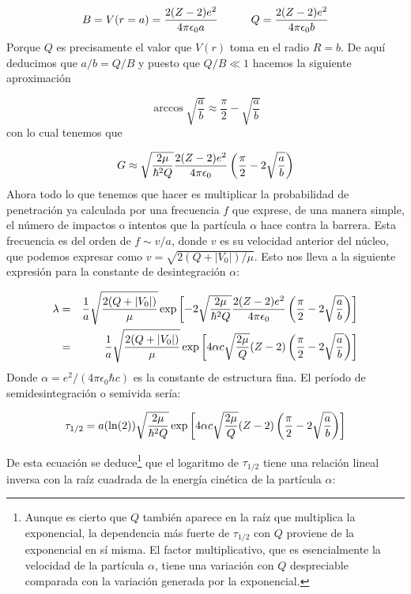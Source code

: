 \begin{equation}
    B= V(r=a) = \frac{2(Z-2)e^2}{4\pi \epsilon_0 a} \quad \quad \quad Q=\frac{2(Z-2)e^2}{4 \pi \epsilon_0 b}
\end{equation}
Porque $Q$ es precisamente el valor que $V(r)$ toma en el radio $R=b$. De aquí deducimos que $a/b=Q/B$ y puesto que $Q/B\ll 1$ hacemos la siguiente aproximación 

\begin{equation}
    \arccos \sqrt{\frac{a}{b}} \approx \frac{\pi}{2} - \sqrt{\frac{a}{b}}
\end{equation}
con lo cual tenemos que 

\begin{equation}
    G \approx  \sqrt{\frac{2\mu}{\hbar^2Q}} \frac{2(Z-2)e^2}{4 \pi \epsilon_0} \left( \frac{\pi}{2} -2 \sqrt{\frac{a}{b}} \right)
\end{equation}
Ahora todo lo que tenemos que hacer es multiplicar la probabilidad de penetración ya calculada por una frecuencia $f$ que exprese, de una manera simple, el número de impactos o intentos que la partícula $\alpha$ hace contra la barrera. Esta frecuencia es del orden de $f \sim v/a$, donde $v$ es su velocidad anterior del núcleo, que podemos expresar como $v=\sqrt{2(Q+|V_0|)/\mu}$. Esto nos lleva a la siguiente expresión para la constante de desintegración $\alpha$:

\begin{eqnarray}
    \lambda & = & \frac{1}{a} \sqrt{\frac{2(Q+|V_0|)}{\mu}} \exp \ccorchetes{-2  \sqrt{\frac{2 \mu}{\hbar^2 Q}} \frac{2(Z-2)e^2}{4 \pi \epsilon_0} \parentesis{\frac{\pi}{2}-2\sqrt{\frac{a}{b}}}} \\ \vspace{5.0mm}
            & = & \frac{1}{a} \sqrt{\frac{2(Q+|V_0|)}{\mu}}  \exp \ccorchetes{4 \alpha c \sqrt{\frac{2 \mu}{Q}} (Z-2) \parentesis{\frac{\pi}{2}-2\sqrt{\frac{a}{b}}}}
\end{eqnarray}
Donde $\alpha=e^2/(4 \pi \epsilon_0 \hbar c)$ es la constante de estructura fina. El período de semidesintegración o semivida sería:
\begin{mybox}
\begin{equation}
    \tau_{1/2} = a (\ln (2)) \sqrt{\frac{2\mu}{\hbar^2Q}} \exp \left[ 4 \alpha c \sqrt{\frac{2 \mu}{Q}} (Z-2) \left( \frac{\pi}{2}-2\sqrt{\frac{a}{b}} \right) \right]
    \label{Ec:02-01-22}
\end{equation}
\end{mybox}
De esta ecuación se deduce\footnote{Aunque es cierto que $Q$ también aparece en la raíz que multiplica la exponencial, la dependencia más fuerte de $\tau_{1/2}$ con $Q$ proviene de la exponencial en sí misma. El factor multiplicativo, que es esencialmente la velocidad de la partícula $\alpha$, tiene una variación con $Q$ despreciable comparada con la variación generada por la exponencial.} que el logaritmo de $\tau_{1/2}$ tiene una relación lineal inversa con la raíz cuadrada de la energía cinética de la partícula $\alpha$:

